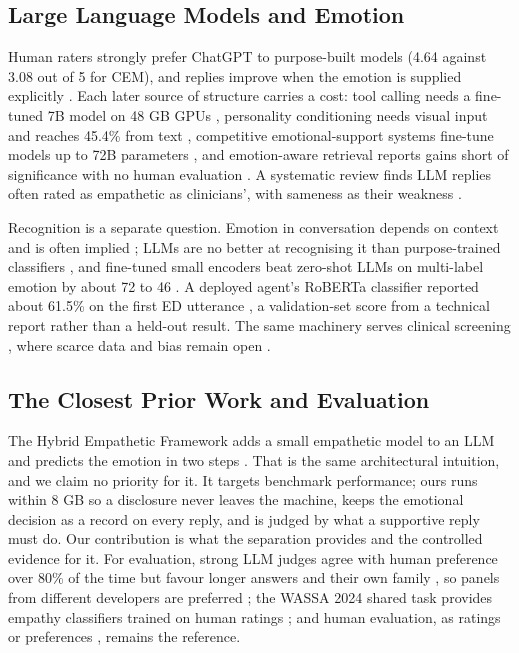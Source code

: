 \subsection{Large Language Models and Emotion}
Human raters strongly prefer ChatGPT to purpose-built models (4.64 against 3.08 out of 5 for CEM), and replies improve when the emotion is supplied explicitly \cite{qian2023llm, loh2023harnessing}. Each later source of structure carries a cost: tool calling needs a fine-tuned 7B model on 48 GB GPUs \cite{cao2025tooled}, personality conditioning needs visual input and reaches 45.4\% from text \cite{wu2025traits}, competitive emotional-support systems fine-tune models up to 72B parameters \cite{wang2025esc}, and emotion-aware retrieval reports gains short of significance with no human evaluation \cite{rasool2025}. A systematic review finds LLM replies often rated as empathetic as clinicians', with sameness as their weakness \cite{sorin2024jmir}.

Recognition is a separate question. Emotion in conversation depends on context \cite{poria2019erc} and is often implied \cite{koga2023implicit}; LLMs are no better at recognising it than purpose-trained classifiers \cite{feng2023affect}, and fine-tuned small encoders beat zero-shot LLMs on multi-label emotion by about 72 to 46 \cite{belay2025}. A deployed agent's RoBERTa classifier reported about 61.5\% on the first ED utterance \cite{paranjape2020chirpy}, a validation-set score from a technical report rather than a held-out result. The same machinery serves clinical screening \cite{lan2024depression, tseriotou2025clpsych}, where scarce data and bias remain open \cite{kumar2024unlocking}.

\subsection{The Closest Prior Work and Evaluation}
The Hybrid Empathetic Framework adds a small empathetic model to an LLM and predicts the emotion in two steps \cite{yang2024hef}. That is the same architectural intuition, and we claim no priority for it. It targets benchmark performance; ours runs within 8 GB so a disclosure never leaves the machine, keeps the emotional decision as a record on every reply, and is judged by what a supportive reply must do. Our contribution is what the separation provides and the controlled evidence for it. For evaluation, strong LLM judges agree with human preference over 80\% of the time but favour longer answers \cite{zheng2023judge} and their own family \cite{panickssery2024}, so panels from different developers are preferred \cite{verga2024}; the WASSA 2024 shared task provides empathy classifiers trained on human ratings \cite{giorgi2024wassa, yang2024hyy33}; and human evaluation, as ratings \cite{qian2023llm} or preferences \cite{cao2025tooled}, remains the reference.

